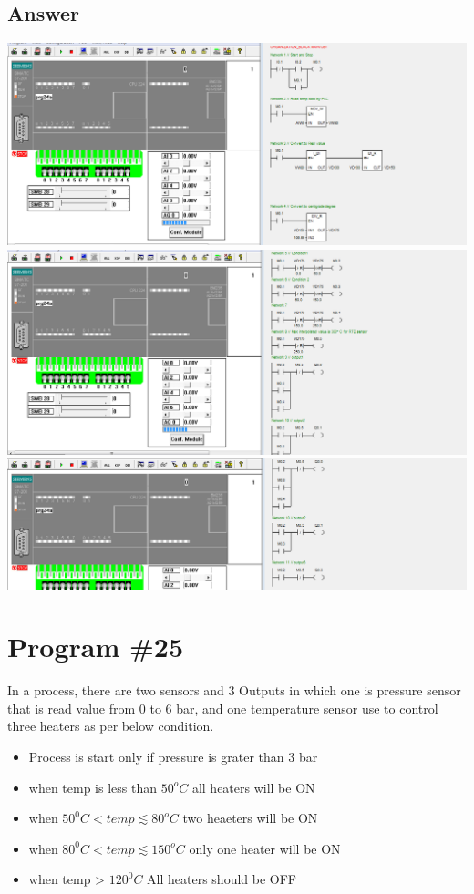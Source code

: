 \documentclass[
	12pt, %
]{fphw}
\begin{document}
\subsection*{Answer}
 \begin{center}
 \includegraphics[width = 165mm, scale =0.9]{prg24a.png}
 \includegraphics[width = 165mm, scale =0.9]{prg24b.png}
 \includegraphics[width = 165mm, scale =0.9]{prg24c.png}
 \end{center}

 \section*{Program \#25}
\begin{problem}
 In a process, there are two sensors and 3 Outputs in which one is pressure
 sensor that is read value from 0 to 6 bar, and one temperature sensor use to
 control three heaters as per below condition. \medskip
 \begin{itemize}
 \item Process is start only if pressure is grater than 3 bar
 \item when temp is less than $50^o C$ all heaters will be ON
 \item when $50^0 C < temp \lesssim 80^o C$ two heaeters will be ON
 \item when $80^0 C < temp \lesssim 150^o C$ only one heater will be ON
 \item when temp > $120^0 C$ All heaters should be OFF
 \end{itemize}
\end{problem}
\end{document}

